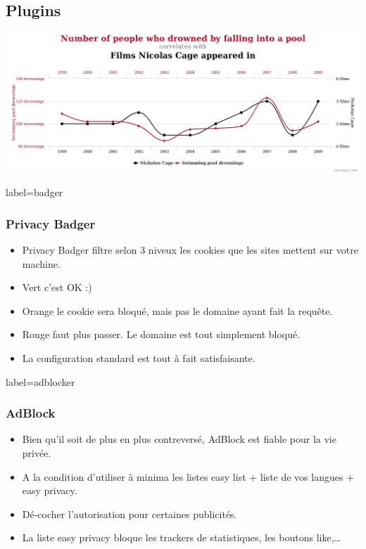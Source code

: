 \documentclass{beamer}
\begin{document}
    \subsection{Plugins}
        \begin{frame}
            \begin{center}
                \includegraphics[scale=0.15]{img/data_science.jpg}
            \end{center}
        \end{frame}
        \begin{frame}{label=badger}
            \frametitle{Privacy Badger}
            \begin{center}
                \begin{itemize}
                    \item Privacy Badger filtre selon 3 niveux les cookies que les sites mettent sur votre machine.
                    \item Vert c'est OK :)
                    \item Orange le cookie sera bloqué, mais pas le domaine ayant fait la requête.
                    \item Rouge faut plus passer. Le domaine est tout simplement bloqué.
                    \item La configuration standard est tout à fait satisfaisante.
                \end{itemize}
            \end{center}
        \end{frame}
        \begin{frame}{label=adblocker}
            \frametitle{AdBlock}
            \begin{center}
                \begin{itemize}
                    \item Bien qu'il soit de plus en plus contreversé, AdBlock est fiable pour la vie privée.
                    \item A la condition d'utiliser à minima les listes easy list + liste de vos langues + easy privacy.
                    \item Dé-cocher l'autorisation pour certaines publicités.
                    \item La liste easy privacy bloque les trackers de statistiques, les boutons like,\ldots
                \end{itemize}
            \end{center}
        \end{frame}
\end{document}
